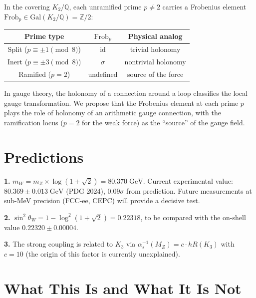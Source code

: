 \documentclass[aps,prl,twocolumn,superscriptaddress,nofootinbib]{revtex4-2}
\newcommand{\Gal}{\mathrm{Gal}}
\begin{document}
In the covering $K_2/\mathbb{Q}$, each unramified prime $p\neq 2$
carries a Frobenius element $\mathrm{Frob}_p\in\Gal(K_2/\mathbb{Q})
=\mathbb{Z}/2$:

\begin{center}
\begin{tabular}{ccc}
\toprule
Prime type & $\mathrm{Frob}_p$ & Physical analog \\
\midrule
Split ($p\equiv\pm 1\!\pmod{8}$) & $\mathrm{id}$ & trivial holonomy \\
Inert ($p\equiv\pm 3\!\pmod{8}$) & $\sigma$ & nontrivial holonomy \\
Ramified ($p=2$) & undefined & source of the force \\
\bottomrule
\end{tabular}
\end{center}

In gauge theory, the holonomy of a connection around a loop
classifies the local gauge transformation.  We propose that the
Frobenius element at each prime $p$ plays the role of holonomy of
an arithmetic gauge connection, with the ramification locus ($p=2$
for the weak force) as the ``source'' of the gauge field.

\section{Predictions}

\noindent\textbf{1.}
$m_W = m_Z\times\log(1{+}\sqrt{2}) = 80.370\;\mathrm{GeV}$.
Current experimental value: $80.369\pm 0.013\;\mathrm{GeV}$ (PDG
2024), $0.09\sigma$ from prediction.  Future measurements at
sub-MeV precision (FCC-ee, CEPC) will provide a decisive test.

\noindent\textbf{2.}
$\sin^2\theta_W = 1-\log^2(1{+}\sqrt{2}) = 0.22318$, to be
compared with the on-shell value $0.22320\pm 0.00004$.

\noindent\textbf{3.}
The strong coupling is related to $K_3$ via $\alpha_s^{-1}(M_Z)
= c\cdot hR(K_3)$ with $c=10$ (the origin of this factor is
currently unexplained).

\section{What This Is and What It Is Not}
\end{document}
